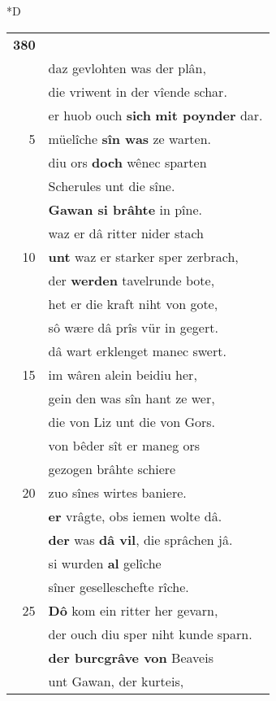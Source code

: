 \documentclass[8pt,a4paper,notitlepage]{article}
\begin{document}
\begin{table}[ht]
\begin{minipage}[t]{0.5\linewidth}
\small
\begin{center}*D
\end{center}
\begin{tabular}{rl}
\textbf{380} & \textbf{\begin{large}D\end{large}ô} \textbf{ersach} mîn hêr Gawan,\\ 
 & daz gevlohten was der plân,\\ 
 & die vriwent in der vîende schar.\\ 
 & er huob ouch \textbf{sich} \textbf{mit poynder} dar.\\ 
5 & müelîche \textbf{sîn was} ze warten.\\ 
 & diu ors \textbf{doch} wênec sparten\\ 
 & Scherules unt die sîne.\\ 
 & \textbf{Gawan si brâhte} in pîne.\\ 
 & waz er dâ ritter nider stach\\ 
10 & \textbf{unt} waz er starker sper zerbrach,\\ 
 & der \textbf{werden} tavelrunde bote,\\ 
 & het er die kraft niht von gote,\\ 
 & sô wære dâ prîs vür in gegert.\\ 
 & dâ wart erklenget manec swert.\\ 
15 & im wâren alein beidiu her,\\ 
 & gein den was sîn hant ze wer,\\ 
 & die von Liz unt die von Gors.\\ 
 & von bêder sît er maneg ors\\ 
 & gezogen brâhte schiere\\ 
20 & zuo sînes wirtes baniere.\\ 
 & \textbf{er} vrâgte, obs iemen wolte dâ.\\ 
 & \textbf{der} was \textbf{dâ vil}, die sprâchen jâ.\\ 
 & si wurden \textbf{al} gelîche\\ 
 & sîner geselleschefte rîche.\\ 
25 & \textbf{Dô} kom ein ritter her gevarn,\\ 
 & der ouch diu sper niht kunde sparn.\\ 
 & \textbf{der burcgrâve von} Beaveis\\ 
 & unt Gawan, der kurteis,\\ 

\end{tabular}
\end{minipage}
\end{table}
\end{document}

